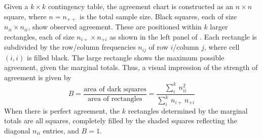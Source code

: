 \documentclass[10pt,krantz2]{krantz}\usepackage[]{graphicx}\usepackage[]{color}
\begin{document}
Given a $k \times k$ contingency table, the agreement chart is constructed as an \(n \times  n\) square,
where $n = n_{++}$ is the total sample size.  Black squares, each of size
\(n_{ii} \times  n_{ii}\), show observed agreement.  These are positioned
within $k$ larger rectangles, each of size \(n_{i+} \times  n_{+i}\)
as shown in the left panel of
.  
Each rectangle is subdivided by the row/column frequencies $n_{ij}$ of
row $i$/column $j$, where cell $(i, i)$ is filled black. The
large rectangle shows the maximum possible agreement, given the
marginal totals.  Thus, a visual impression of the strength of
agreement is given by
\begin{equation}\label{eq:bangb}
  B  =
  \frac{ \mbox{area of dark squares}}
  { \mbox{area of rectangles}}  =
  \frac{ \sum_i^k \,  n_{ii}^2 }
  { \sum_i^k \,  n_{i+} \,  n_{+i} }
\end{equation}
When there is perfect agreement, the $k$ rectangles determined by the
marginal totals are all squares, completely filled by the shaded squares
reflecting the diagonal $n_{ii}$ entries, and $B = 1$.
\end{document}
